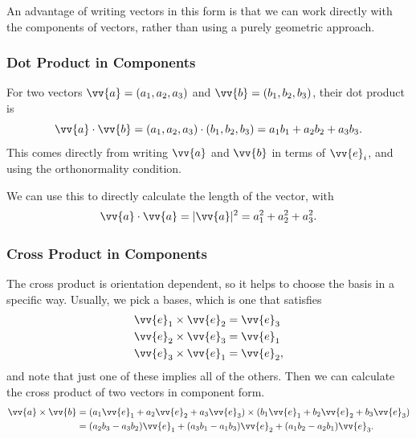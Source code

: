 An advantage of writing vectors in this form is that we can work directly with the components of vectors, rather than using a purely geometric approach.

\subsubsection{Dot Product in Components}

For two vectors $\vv{a} = (a_1, a_2, a_3)$ and $\vv{b} = (b_1, b_2, b_3)$, their dot product is
$$
\vv{a} \cdot \vv{b} = (a_1, a_2, a_3) \cdot (b_1, b_2, b_3) = a_1 b_1 + a_2 b_2 + a_3 b_3.
$$
This comes directly from writing $\vv{a}$ and $\vv{b}$ in terms of $\vv{e}_i$, and using the orthonormality condition.

We can use this to directly calculate the length of the vector,
with
$$
\vv{a}\cdot\vv{a} = |\vv{a}|^2 = a_1 ^2 + a_2 ^2 + a_3^2.
$$

\subsubsection{Cross Product in Components}

The cross product is orientation dependent, so it helps to choose the basis in a specific way. Usually, we pick a  bases, which is one that satisfies
\begin{align*}
    \vv{e}_1 \times \vv{e}_2 &= \vv{e}_3 \\
    \vv{e}_2 \times \vv{e}_3 &= \vv{e}_1 \\
    \vv{e}_3 \times \vv{e}_1 &= \vv{e}_2,
\end{align*} 
and note that just one of these implies all of the others.
Then we can calculate the cross product of two vectors in component form.
\begin{align*}
    \vv{a} \times \vv{b} &= (a_1 \vv{e}_1 + a_2 \vv{e}_2 + a_3 \vv{e}_3) \times (b_1 \vv{e}_1 + b_2 \vv{e}_2 + b_3 \vv{e}_3) \\
        &= (a_2 b_3 - a_3 b_2) \vv{e}_1 + (a_3 b_1 - a_1 b_3) \vv{e}_2 + (a_1 b_2 - a_2 b_1) \vv{e}_3.
\end{align*}

